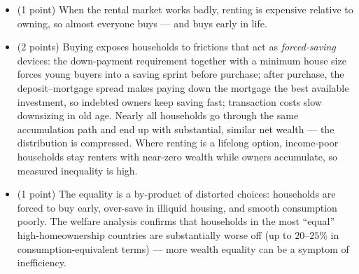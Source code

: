 \begin{parts}
    \begin{solutionorbox}[12cm]
        \begin{itemize}
            \item (1 point) When the rental market works badly, renting is expensive relative to owning, so almost everyone buys — and buys early in life.
            \item (2 points) Buying exposes households to frictions that act as \emph{forced-saving} devices: the down-payment requirement together with a minimum house size forces young buyers into a saving sprint before purchase; after purchase, the deposit--mortgage spread makes paying down the mortgage the best available investment, so indebted owners keep saving fast; transaction costs slow downsizing in old age. Nearly all households go through the same accumulation path and end up with substantial, similar net wealth — the distribution is compressed. Where renting is a lifelong option, income-poor households stay renters with near-zero wealth while owners accumulate, so measured inequality is high.
            \item (1 point) The equality is a by-product of distorted choices: households are forced to buy early, over-save in illiquid housing, and smooth consumption poorly. The welfare analysis confirms that households in the most ``equal'' high-homeownership countries are substantially worse off (up to $20$--$25\%$ in consumption-equivalent terms) — more wealth equality can be a symptom of inefficiency.
        \end{itemize}
    \end{solutionorbox}
\end{parts}
